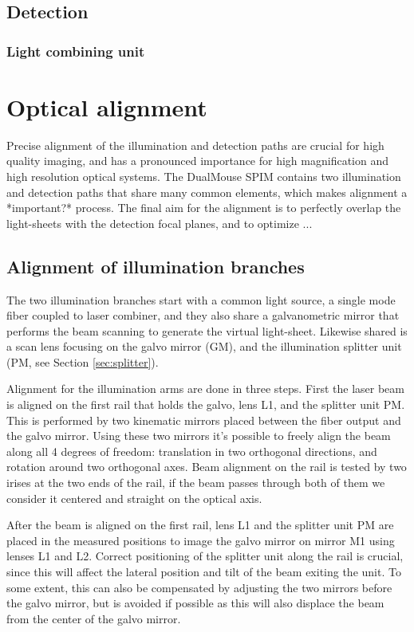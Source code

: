  \subsection{Detection}
    \subsubsection{Light combining unit}
      \label{sec:dualMirror}


\section{Optical alignment}
  Precise alignment of the illumination and detection paths are crucial for high quality imaging, and has a pronounced  importance for high magnification and high resolution optical systems. The DualMouse SPIM contains two illumination and detection paths that share many common elements, which makes alignment a *important?* process. The final aim for the alignment is to perfectly overlap the light-sheets with the detection focal planes, and to optimize ... 

  \subsection{Alignment of illumination branches}

    The two illumination branches start with a common light source, a single mode fiber coupled to laser combiner, and they also share a galvanometric mirror that performs the beam scanning to generate the virtual light-sheet. Likewise shared is a scan lens focusing on the galvo mirror (GM), and the illumination splitter unit (PM, see Section \ref{sec:splitter}).

    Alignment for the illumination arms are done in three steps. First the laser beam is aligned on the first rail that holds the galvo, lens L1, and the splitter unit PM. This is performed by two kinematic mirrors placed between the fiber output and the galvo mirror. Using these two mirrors it's possible to freely align the beam along all 4 degrees of freedom: translation in two orthogonal directions, and rotation around two orthogonal axes. Beam alignment on the rail is tested by two irises at the two ends of the rail, if the beam passes through both of them we consider it centered and straight on the optical axis.

    After the beam is aligned on the first rail, lens L1 and the splitter unit PM are placed in the measured positions to image the galvo mirror on mirror M1 using lenses L1 and L2. Correct positioning of the splitter unit along the rail is crucial, since this will affect the lateral position and tilt of the beam exiting the unit. To some extent, this can also be compensated by adjusting the two mirrors before the galvo mirror, but is avoided if possible as this will also displace the beam from the center of the galvo mirror.

